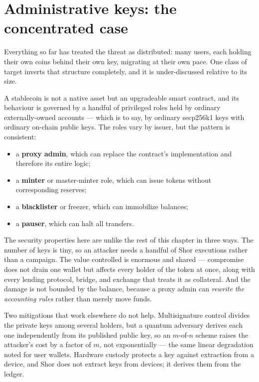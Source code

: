 \section{Administrative keys: the concentrated case}
\label{sec:admin-keys}

Everything so far has treated the threat as distributed: many users, each holding
their own coins behind their own key, migrating at their own pace. One class of
target inverts that structure completely, and it is under-discussed relative to
its size.

A stablecoin is not a native asset but an upgradeable smart contract, and its
behaviour is governed by a handful of privileged roles held by ordinary
externally-owned accounts --- which is to say, by ordinary secp256k1 keys with
ordinary on-chain public keys. The roles vary by issuer, but the pattern is
consistent:

\begin{itemize}
  \item a \textbf{proxy admin}, which can replace the contract's implementation
        and therefore its entire logic;
  \item a \textbf{minter} or master-minter role, which can issue tokens without
        corresponding reserves;
  \item a \textbf{blacklister} or freezer, which can immobilize balances;
  \item a \textbf{pauser}, which can halt all transfers.
\end{itemize}

The security properties here are unlike the rest of this chapter in three ways.
The number of keys is tiny, so an attacker needs a handful of Shor executions
rather than a campaign. The value controlled is enormous and shared --- compromise
does not drain one wallet but affects every holder of the token at once, along
with every lending protocol, bridge, and exchange that treats it as collateral.
And the damage is not bounded by the balance, because a proxy admin can
\emph{rewrite the accounting rules} rather than merely move funds.

Two mitigations that work elsewhere do not help. Multisignature control divides
the private keys among several holders, but a quantum adversary derives each one
independently from its published public key, so an $m$-of-$n$ scheme raises the
attacker's cost by a factor of $m$, not exponentially --- the same linear
degradation noted for user wallets. Hardware custody protects a key against
extraction from a device, and Shor does not extract keys from devices; it derives
them from the ledger.


